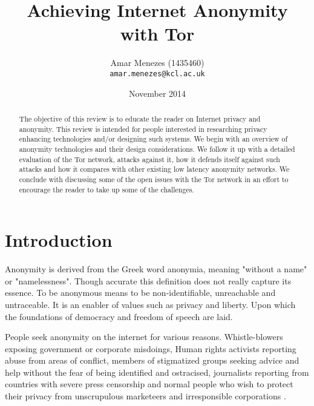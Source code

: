 \documentclass{llncs}
\begin{document}
\author{Amar Menezes (1435460)\\
\texttt{amar.menezes@kcl.ac.uk}}
\title{Achieving Internet Anonymity with Tor}
\date{November 2014}
\maketitle

\begin{abstract} 
	The objective of this review is to educate the reader on Internet privacy and anonymity. This review is intended for people interested in researching privacy enhancing technologies and/or designing such systems. We begin with an overview of anonymity technologies and their design considerations. We follow it up with a detailed evaluation of the Tor network, attacks against it, how it defends itself against such attacks and how it compares with other existing low latency anonymity networks. We conclude with discussing some of the open issues with the Tor network in an effort to encourage the reader to take up some of the challenges. 
\end{abstract}

\section{Introduction} \label{intro}
Anonymity is derived from the Greek word anonymia, meaning "without a name" or "namelessness". Though accurate this definition does not really capture its essence. To be anonymous means to be non-identifiable, unreachable and untraceable. It is an enabler of values such as privacy and liberty. Upon which the foundations of democracy and freedom of speech are laid.

People seek anonymity on the internet for various reasons. Whistle-blowers exposing government or corporate misdoings, Human rights activists reporting abuse from areas of conflict, members of stigmatized groups seeking advice and help without the fear of being identified and ostracised, journalists reporting from countries with severe press censorship and normal people who wish to protect their privacy from unscrupulous marketeers and irresponsible corporations \cite{seekanonymity}.
\end{document}
